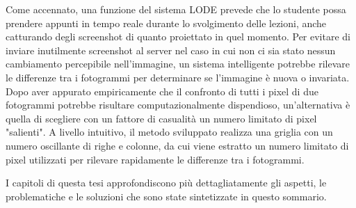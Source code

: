 Come accennato, una funzione del sistema LODE prevede che lo studente possa prendere appunti in tempo reale durante lo svolgimento delle lezioni, anche catturando degli screenshot di quanto proiettato in quel momento. Per evitare di inviare inutilmente screenshot al server nel caso in cui non ci sia stato nessun cambiamento percepibile nell'immagine, un sistema intelligente potrebbe rilevare le differenze tra i fotogrammi per determinare se l'immagine è nuova o invariata. Dopo aver appurato empiricamente che il confronto di tutti i pixel di due fotogrammi potrebbe risultare computazionalmente dispendioso, un'alternativa è quella di scegliere con un fattore di casualità un numero limitato di pixel "salienti". A livello intuitivo, il metodo sviluppato realizza una griglia con un numero oscillante di righe e colonne, da cui viene estratto un numero limitato di pixel utilizzati per rilevare rapidamente le differenze tra i fotogrammi.

I capitoli di questa tesi approfondiscono più dettagliatamente gli aspetti, le problematiche e le soluzioni che sono state sintetizzate in questo sommario.


